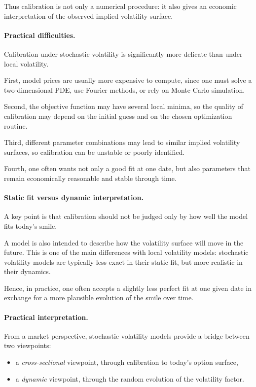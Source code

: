 \documentclass[11pt]{article}
\theoremstyle{plain}
\theoremstyle{definition}
\theoremstyle{remark}
\begin{document}
Thus calibration is not only a numerical procedure: it also gives an
economic interpretation of the observed implied volatility surface.

\paragraph{Practical difficulties.}

Calibration under stochastic volatility is significantly more delicate
than under local volatility.

First, model prices are usually more expensive to compute, since one
must solve a two-dimensional PDE, use Fourier methods, or rely on Monte
Carlo simulation.

Second, the objective function may have several local minima, so the
quality of calibration may depend on the initial guess and on the chosen
optimization routine.

Third, different parameter combinations may lead to similar implied
volatility surfaces, so calibration can be unstable or poorly
identified.

Fourth, one often wants not only a good fit at one date, but also
parameters that remain economically reasonable and stable through time.

\paragraph{Static fit versus dynamic interpretation.}

A key point is that calibration should not be judged only by how well
the model fits today's smile.

A model is also intended to describe how the volatility surface will
move in the future.
This is one of the main differences with local volatility models:
stochastic volatility models are typically less exact in their static
fit, but more realistic in their dynamics.

Hence, in practice, one often accepts a slightly less perfect fit at one
given date in exchange for a more plausible evolution of the smile over
time.

\paragraph{Practical interpretation.}

From a market perspective, stochastic volatility models provide a bridge
between two viewpoints:
\begin{itemize}[leftmargin=1.4em]
    \item a \emph{cross-sectional} viewpoint, through calibration to
    today's option surface,
    \item a \emph{dynamic} viewpoint, through the random evolution of the
    volatility factor.
\end{itemize}
\end{document}
